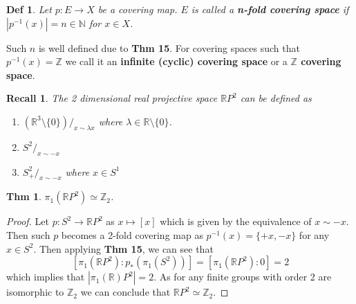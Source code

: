 \documentclass[paper=a4, fontsize=11pt]{scrartcl}
\newtheorem{theorem}{Thm}
\newtheorem{definition}{Def}
\newtheorem*{recall}{Recall}
\begin{document}
\begin{definition}
	Let $p:E\to X$ be a covering map. $E$ is called a \textbf{n-fold covering space} if $|p^{-1}(x)|=n \in \mathbb{N}$ for $x\in X$.\\
\end{definition}

 Such $n$ is well defined due to \textbf{Thm 15}. For covering spaces such that $p^{-1}(x)=\mathbb{Z}$ we call it an \textbf{infinite (cyclic) covering space} or a \textbf{$\mathbb{Z}$ covering space}.

\vspace{0.15in}

\begin{recall}
	The 2 dimensional real projective space $\mathbb{R}P^2$ can be defined as 
	\begin{enumerate}[label=\arabic*)]
		\item $\left(\mathbb{R}^3 \setminus \{0\} \right)/_{x \sim \lambda x}$ where $\lambda \in \mathbb{R}\setminus \{0\}$.
		\item $S^2 /_{x \sim - x}$ 
		\item $S^2_+ /_{x \sim - x}$ where $x\in S^1$

	\end{enumerate}
\end{recall}

\vspace{0.15in}

\begin{theorem}
	$\pi_1(\mathbb{R}P^2) \simeq \mathbb{Z}_2$.\\
\end{theorem}

\begin{proof}
Let $p:S^2 \to \mathbb{R}P^2$ as $x \mapsto [x]$ which is given by the equivalence of $x \sim -x$. Then such $p$ becomes a 2-fold covering map as $p^{-1}(x) = \{+x,-x\}$ for any $x\in S^2$. Then applying \textbf{Thm 15}, we can see that 
\begin{equation} \nonumber
	[ \pi_1(\mathbb{R}P^2):p_\ast(\pi_1(S^2))] = [\pi_1(\mathbb{R}P^2):0] =2
\end{equation}
which implies that $|\pi_1(\mathbb{R})P^2|=2$. As for any finite groups with order 2 are isomorphic to $\mathbb{Z}_2$ we can conclude that $\mathbb{R}P^2 \simeq \mathbb{Z}_2$.
\end{proof}
\end{document}

